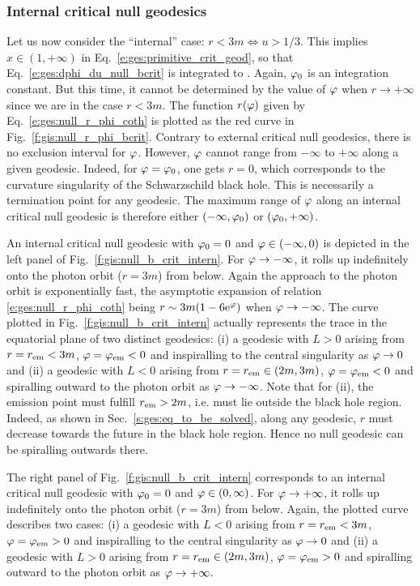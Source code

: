 \subsubsection{Internal critical null geodesics}

Let us now consider the ``internal'' case: $r< 3m \iff u>1/3$.
This implies $x\in (1,+\infty)$ in Eq.~\eqref{e:ges:primitive_crit_geod},
so that Eq.~\eqref{e:ges:dphi_du_null_bcrit} is integrated to
\be \label{e:ges:null_r_phi_coth}
    .
\ee
Again, $\varphi_0$ is an integration constant. But this time, it cannot be determined by the
value of $\varphi$ when $r\to +\infty$ since we are in the case $r<3m$.
The function $r(\varphi)$ given by Eq.~\eqref{e:ges:null_r_phi_coth} is plotted as the red
curve in Fig.~\ref{f:gis:null_r_phi_bcrit}. Contrary to external critical null geodesics, there
is no exclusion interval for $\varphi$. However, $\varphi$ cannot range from $-\infty$
to $+\infty$ along a given geodesic. Indeed, for $\varphi=\varphi_0$, one gets
$r=0$, which corresponds to the curvature singularity of the Schwarzschild black hole.
This is necessarily a termination point for any geodesic. The maximum
range of $\varphi$ along an internal critical null geodesic is therefore
either $(-\infty,\varphi_0)$ or $(\varphi_0,+\infty)$.

An internal critical null geodesic with $\varphi_0=0$ and $\varphi\in(-\infty,0)$
is depicted in the left panel of Fig.~\ref{f:gis:null_b_crit_intern}.
For $\varphi\to -\infty$, it rolls up indefinitely onto the photon
orbit ($r=3m$) from below. Again the approach to the photon orbit is exponentially
fast, the asymptotic expansion of relation \eqref{e:ges:null_r_phi_coth} being
$r\sim 3m (1 - 6 \mathrm{e}^\varphi)$ when $\varphi\to -\infty$.
The curve plotted in Fig.~\ref{f:gis:null_b_crit_intern} actually represents the trace in the equatorial plane of two
distinct geodesics: (i) a geodesic with $L>0$ arising
from $r=r_{\rm em} < 3 m$, $\varphi=\varphi_{\rm em}<0$ and inspiralling to the
central singularity as $\varphi\to 0$ and (ii) a geodesic with $L<0$ arising from
$r = r_{\rm em} \in (2m,  3 m)$, $\varphi=\varphi_{\rm em}<0$ and spiralling outward
to the photon orbit as $\varphi\to -\infty$. Note that for (ii), the
emission point must fulfill $r_{\rm em} > 2m$, i.e. must lie outside the black
hole region. Indeed, as shown in Sec.~\ref{s:ges:eq_to_be_solved}, along
any geodesic, $r$ must decrease towards the future in the black hole region.
Hence no null geodesic can be spiralling outwards there.

The right panel of Fig.~\ref{f:gis:null_b_crit_intern} corresponds to an
internal critical null geodesic with $\varphi_0=0$ and $\varphi\in(0, \infty)$.
For $\varphi\to +\infty$, it rolls up indefinitely onto the photon
orbit ($r=3m$) from below. Again, the plotted curve describes two cases:
(i) a geodesic with $L<0$ arising
from $r=r_{\rm em} < 3 m$, $\varphi=\varphi_{\rm em}>0$ and inspiralling to the
central singularity as $\varphi\to 0$ and (ii) a geodesic with $L>0$ arising from
$r = r_{\rm em} \in (2m,  3 m)$, $\varphi=\varphi_{\rm em}>0$ and spiralling outward
to the photon orbit as $\varphi\to +\infty$.

